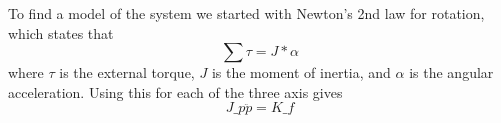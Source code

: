 To find a model of the system we started with Newton's 2nd law for rotation, which states that
\begin{equation} \label{eq:N2rot}
\sum \tau = J*\alpha
\end{equation}
where $\tau$ is the external torque, $J$ is the moment of inertia, and $\alpha$ is the angular acceleration. Using this for each of the three axis gives
\begin{equation} \label{eq:system}
J\_p\ddot p = K\_f 
\end{equation}